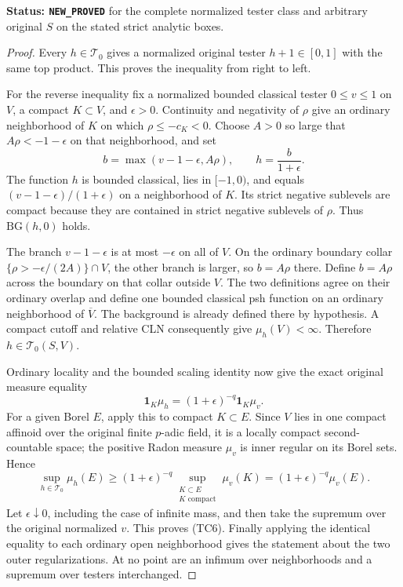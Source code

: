 \documentclass[11pt,a4paper]{article}
\numberwithin{equation}{section}
\theoremstyle{definition}
\theoremstyle{remark}
\begin{document}
\noindent\textbf{Status: \texttt{NEW\_PROVED}} for the complete
normalized tester class and arbitrary original $S$ on the stated
strict analytic boxes.

\begin{proof}
Every $h\in\mathscr T_0$ gives a normalized original tester
$h+1\in[0,1]$ with the same top product. This proves the
inequality from right to left.

For the reverse inequality fix a normalized bounded classical
tester $0\leq v\leq1$ on $V$, a compact $K\subset V$, and
$\epsilon>0$. Continuity and negativity of $\rho$ give an
ordinary neighborhood of $K$ on which $\rho\leq-c_K<0$.
Choose $A>0$ so large that $A\rho<-1-\epsilon$ on that
neighborhood, and set
\[
             b=\max(v-1-\epsilon,A\rho),\qquad
             h=\frac{b}{1+\epsilon}.
 \tag{TC7}
\]
The function $h$ is bounded classical, lies in $[-1,0)$, and
equals $(v-1-\epsilon)/(1+\epsilon)$ on a neighborhood of $K$.
Its strict negative sublevels are compact because they are
contained in strict negative sublevels of $\rho$.
Thus $\mathrm{BG}(h,0)$ holds.

The branch $v-1-\epsilon$ is at most $-\epsilon$ on all of $V$.
On the ordinary boundary collar
$\{\rho>-\epsilon/(2A)\}\cap V$, the other branch is larger,
so $b=A\rho$ there. Define $b=A\rho$ across the boundary on
that collar outside $V$. The two definitions agree on their
ordinary overlap and define one bounded classical psh function
on an ordinary neighborhood of $\overline V$.
The background is already defined there by hypothesis.
A compact cutoff and relative CLN consequently give
$\mu_h(V)<\infty$. Therefore $h\in\mathscr T_0(S,V)$.

Ordinary locality and the bounded scaling identity now give
the exact original measure equality
\[
                \mathbf1_K\mu_h
                    =(1+\epsilon)^{-q}\mathbf1_K\mu_v.
 \tag{TC8}
\]
For a given Borel $E$, apply this to compact $K\subset E$.
Since $V$ lies in one compact affinoid over the original finite
$p$-adic field, it is a locally compact second-countable space;
the positive Radon measure $\mu_v$ is inner regular on its
Borel sets. Hence
\[
 \sup_{h\in\mathscr T_0}\mu_h(E)
       \geq (1+\epsilon)^{-q}
                              \sup_{\substack{K\subset E\\K\text{ compact}}}\mu_v(K)
       =(1+\epsilon)^{-q}\mu_v(E).
\]
Let $\epsilon\downarrow0$, including the case of infinite mass,
and then take the supremum over the original normalized $v$.
This proves (TC6). Finally applying the identical equality to
each ordinary open neighborhood gives the statement about the
two outer regularizations. At no point are an infimum over
neighborhoods and a supremum over testers interchanged.
\end{proof}
\end{document}
